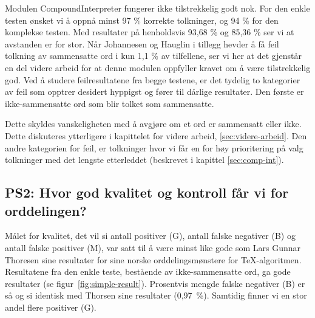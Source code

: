 Modulen CompoundInterpreter fungerer ikke tilstrekkelig godt nok. For den enkle testen ønsket vi å oppnå minst 97 \% korrekte tolkninger, og 94 \% for den komplekse testen. Med resultater på henholdsvis 93,68 \% og 85,36 \% ser vi at avstanden er for stor. Når Johannesen og Hauglin i tillegg hevder å få feil tolkning av sammensatte ord i kun 1,1 \% av tilfellene, ser vi her at det gjenstår en del videre arbeid for at denne modulen oppfyller kravet om å være tilstrekkelig god. Ved å studere feilresultatene fra begge testene, er det tydelig to kategorier av feil som opptrer desidert hyppigst og fører til dårlige resultater. Den første er ikke-sammensatte ord som blir tolket som sammensatte.

\newline
{}\newline
{} 

Dette skyldes vanskeligheten med å avgjøre om et ord er sammensatt eller ikke. Dette diskuteres ytterligere i kapittelet for videre arbeid, \ref{sec:videre-arbeid}. Den andre kategorien for feil, er tolkninger hvor vi får en for høy prioritering på  valg tolkninger med det lengste etterleddet (beskrevet i kapittel \ref{sec:comp-int}). 

\newline
{}\newline
{}\newline
{}\newline
{}

\subsection{PS2: Hvor god kvalitet og kontroll får vi for orddelingen?}


Målet for kvalitet, det vil si antall positiver (G), antall falske negativer (B) og antall falske positiver (M), var satt til å være minst like gode som Lars Gunnar Thoresen sine resultater for sine norske orddelingsmønstere for \TeX{}-algoritmen. Resultatene fra den enkle teste, bestående av ikke-sammensatte ord, ga gode resultater (se figur~\ref{fig:simple-result}). Prosentvis mengde falske negativer (B) er så og si identisk med Thorsen sine resultater (0,97~\%). Samtidig finner vi en stor andel flere positiver (G). 

